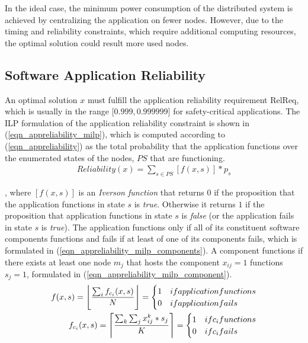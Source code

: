 In the ideal case, the minimum power consumption of the distributed system is achieved by centralizing the application on fewer nodes. However, due to the timing and reliability constraints, which require additional computing resources, the optimal solution could result more used nodes. 

\subsection{Software Application Reliability}
An optimal solution $x$ must fulfill the application reliability requirement RelReq, which is usually in the range [$0.999, 0.999999$] for safety-critical applications. The ILP formulation of the application reliability constraint is shown in (\ref{eqn_appreliability_milp}), which is computed according to (\ref{eqn_appreliability}) as the total probability that the application functions over the enumerated states of the nodes, $P\!S$ that are functioning.
\begin{align}
\label{eqn_appreliability_milp}
Reliability(x)=\sum_{s\in PS}[f(x,s)]*p_s
\end{align}

, where $[f(x,s)]$ is an \textit{Iverson function } that returns $0$ if the proposition that the application functions in state $s$ is \textit{true}. Otherwise it returns $1$ if the proposition that application functions in state $s$ is \textit{false} (or the application fails in state $s$ is \textit{true}). The application functions only if all of its constituent software components functions and fails if at least of one of its components fails, which is formulated in (\ref{eqn_appreliability_milp_components}). A component functions if there exists at least one node $m_j$ that hosts the component $x_{ij}=1$ functions $s_{j}=1$, formulated in (\ref{eqn_appreliability_milp_component}). 
\begin{align}
f(x,s) = \floor[\Bigg]{\frac{\sum_if_{c_i}(x,s)}{N}}=
\begin{cases}
1 & \mbox{if } application \mbox{ functions}\\
0 & \mbox{if } application \mbox{ fails}
\end{cases}\label{eqn_appreliability_milp_components}\\
f_{c_i}(x,s) = \ceil[\Bigg]{\frac{\sum_k\sum_j x^{k}_{ij}*s_j}{K}}=
\begin{cases}
1 & \mbox{if } c_i \mbox{ functions}\\
0 & \mbox{if } c_i \mbox{ fails}
\end{cases}\label{eqn_appreliability_milp_component}
\end{align}

